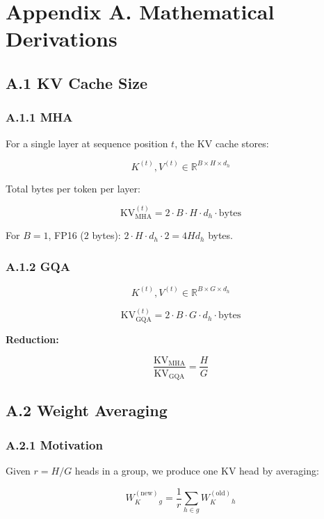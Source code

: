 
\section{Appendix A. Mathematical Derivations}

\subsection{A.1 KV Cache Size}

\subsubsection{A.1.1 MHA}

For a single layer at sequence position $t$, the KV cache stores:

\[
K^{(t)}, V^{(t)} \in \mathbb{R}^{B \times H \times d_h}
\tag{A.1}
\]

Total bytes per token per layer:

\[
\text{KV}^{(t)}_\text{MHA} = 2 \cdot B \cdot H \cdot d_h \cdot \text{bytes}
\tag{A.2}
\]

For $B = 1$, FP16 ($2$ bytes): $2 \cdot H \cdot d_h \cdot 2 = 4 H d_h$ bytes.

\subsubsection{A.1.2 GQA}

\[
K^{(t)}, V^{(t)} \in \mathbb{R}^{B \times G \times d_h}
\tag{A.3}
\]

\[
\text{KV}^{(t)}_\text{GQA} = 2 \cdot B \cdot G \cdot d_h \cdot \text{bytes}
\tag{A.4}
\]

\textbf{Reduction:}

\[
\frac{\text{KV}_\text{MHA}}{\text{KV}_\text{GQA}} = \frac{H}{G}
\tag{A.5}
\]

\subsection{A.2 Weight Averaging}

\subsubsection{A.2.1 Motivation}

Given $r = H / G$ heads in a group, we produce one KV head by averaging:

\[
W_K^{(\text{new})}_g = \frac{1}{r} \sum_{h \in g} W_K^{(\text{old})}_h
\tag{A.6}
\]

